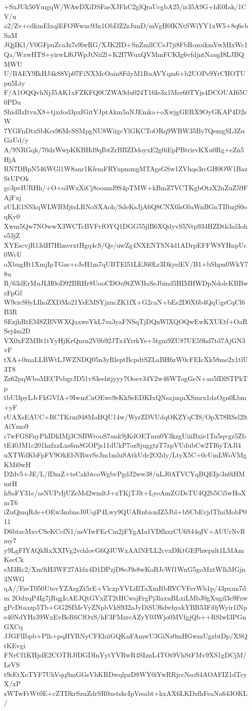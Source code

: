 +SxJUk50YmgqW/WAwDXiDSFaeXJFhC2glQraUcgbA25/ir35A9G+hE0Iak/1CV/u
a2/Zv+cdkmElxqlEFOWwuc93x1ObDZ2zJunD/mVgH0lKNtSWiYY1xW5+8q6cbSaM
JQjIK1/V0GFpuZca3z7s9lwRG/XJK2ID+SnZmllCCsJ7ji8FbRozoikmVwMIxWc1
Qa/WxwHTS+yirwLf6JWpJtNii2l+K2I7WuxQVMmFCKIg6vfdjntNaugI8LJBQMWU
U/BAEY9IkHJ4k88Vp07FiNXMcOain8FdyM1RuAVYqm6+b2UOPe9YrCHOTUpn5Lty
F/A1OQQvhNjJ5AK1xFZKFQ0CZWA9du024T16Ie3x1Mer60TYjs4DCOUAI65C0PDu
ShidlIzItvnX8+tjxdod3pxIGitYJptAkm5aNJEmka+oXwjgGERX9OyGKAP4D2sW
7YGFnDtxSbKcs96McSSMpgNU8WiigcYlGKCToORq9WBW35By7QemgSL3ZuGaUd/y
A/9NRGqk/70dzWwpKKBHd9qIbtZrBBZDdoyxE2g0iEpPBtrirvKXu0Rg+eZn5HjA
RN7DBpN546WGl1W8anr1KfemFRYupmmgMTAgsGSw1ZVhqs3rcGH0OW1BazStUPOk
gc3pvIURHh/+O+o3WxXiCj8oouml9S4pTMW+kBmZ7VCTKgbOtzX2nZuZ59FAjFxj
zULE1SNkqWLWBMjtsLRNoSXAoh/SdeKsJjA6Q8CNX6lsOluWnBGnTBbzjS0oqKy0
Xwm5Qw7NOwwX3WCTcBVFvfOYQ1DGG55jlB6XQdyvS5Ntp934HZDtk3al3ohe53jZ
XYEscvjR13dH7HlmvrxtHgq4cS/Qe/uwZg4NXENTSN4d1ADrpEFFW8YHnpUc0WcU
oXbugHt1XmjIpTGzs+cJeH1m7qUBTEl51LEJ60Lr3DkyelEV/B1+bShpn0WkY78u
R/63dErMuJLH0oD92BRHr8UooCDOu9tZWBaSeJbind5HIMHWDpNdolcKBBwzFpGf
W9cicS0yLIhoZXDMo21YsEMSYjzncZK1fX+G2caN+bEs2D0X6b4QqUgsCqCl6B3R
SEzjhRtEM8ZBNWXQaxweYkL7va3yaFNSqTjDQnWlXQOQwEwKXUEtf+OaRSej4m2D
VX0xFZMBt1tYyHjKrQnrn2V0b92JTx4YrrkYe+5tgm9ZU87UE59hd7td7AjGN3vF
tXA+0maLLBWtLJWZNDQ05n3yRleptBcpdtSZLaBH6zW0cFEIcXk58me2x1tlU3T8
Zz62pqWboMECPsbgrJD51v83eehtjyyy7Ooev34Y2w46WTogGeN+ao5fDlSTPkTp
tbUl3pyLJcFkGVfA+9IwmCnOEwc9eKkSeEDKIxQNsajuquXSmrx1daOgn0Lbm+yF
rUAXsEAUC+RCTKrm948MoHQU14w/WyrZDVUdqOKZYqCIS/OpX78RSsl2ltAiYmo9
c7wFGSFnyPhIDkIMj3CSBWrooS7unk9jKdOETmu0Y3kzgUiiiBxie1Tn5qvgz5Zb
tE40JM1c201hzfxzLxs6m8GOPjs11dUkP7ozSjuggtzT7zpVUdubCw2TI6yTAJl4
uXTWdKbFpFV9OkEbNRwrSrJm1mluSAtkUde2O2dy/LtyX5C+0cUmLWoVMgKMi0wH
D2dv5+JE/L/fDmZ+tsCakbtcoWgbvPgdJ2ww38/nLJ0ATVCYqBQEIjc3n0iHMmtH
hSaFY31e/asNUPrIjUZeMd2wmltJ+zTKjTJlt+LyoAmZGDsTU4Q2b5Ci5wHoXmT6
iZuQmqRde+OEw3mbnsJ0UqiP4Lwy9QUARnbionIZ5Jbl+bSCbEvjdTfniMobP011
D6btzcMxvCSeKCcfN1/neVIwFEcCm2jFYgAIa1VDfhxzCU6S44qIV+AUUrNvRmy7
y9LgFIYAQkRxXXIVg2vchlovG6Q3UWxAAlNFLL2cvxDKtGEPhwpzlt1LMAmKecCk
eM3Rc2/Xm9iH3WF27Aldx4D1DPzjD8eJ9s8wKoBJcWf1WnG5goMxtWlhMGjn3NWG
qA//FzeT050UtevYZAsgZt5rE+VlcxpYVLiIlTaXmRbRVCVFerWb1p/43pxun7dm
2OdxqP4Ig7jRqgIcAEJQtGVxZT2tHCwsjFrgPj3laxuBLxiLMbJ0gXugil3c9Fzw
gPcDtaazp5Tb+GG2SIMcVyZNpbVkS932aJyDiSUf6dwhyskYBR53Fi0jWyir1lNp
e40NdYHz39WxEvBeR6CfOxS/hF3FMzreAZyY03Wjo0MVfgjQb++RSlwI3PGnGXCq
JJGFlIbpb+Plh+pqHYRNyCFEhiiGQKnFAmwU3GiNz0mHGwmUgzbtDp/XSQtKEvgi
FNrCf1KHjsfE2COTRJfDGDInYytYVRwR4SIznL4TOt9VhStFMv9XS1gDCjM/LsVS
t9sEtXeTYF7UhVqqSmGGsVhKRDwqlpzD8WY0iYwRRjccNsoS4AOAFIZ1dTcyX/xP
zWTwFrWt0E+cZTDkrSzuZdrSR0xetskcIpVrsabt+kxAX6LKDzfhFeaNa643OKL/
